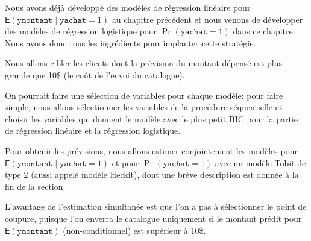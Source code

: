 \documentclass[
  11pt,
  letterpaper,
]{scrbook}
\theoremstyle{definition}
\theoremstyle{remark}
\begin{document}
Nous avons déjà développé des modèles de régression linéaire pour
\(\mathsf{E}(\texttt{ymontant} \mid \texttt{yachat}=1)\) au chapitre
précédent et nous venons de développer des modèles de régression
logistique pour \(\Pr(\texttt{yachat}=1)\) dans ce chapitre. Nous avons
donc tous les ingrédients pour implanter cette stratégie.

Nous allons cibler les clients dont la prévision du montant dépensé est
plus grande que 10\$ (le coût de l'envoi du catalogue).

On pourrait faire une sélection de variables pour chaque modèle: pour
faire simple, nous allons sélectionner les variables de la procédure
séquentielle et choisir les variables qui donnent le modèle avec le plus
petit BIC pour la partie de régression linéaire et la régression
logistique.

Pour obtenir les prévisions, nous allons estimer conjointement les
modèles pour \(\mathsf{E}(\texttt{ymontant} \mid \texttt{yachat}=1)\) et
pour \(\Pr(\texttt{yachat}=1)\) avec un modèle Tobit de type 2 (aussi
appelé modèle Heckit), dont une brève description est donnée à la fin de
la section.

L'avantage de l'estimation simultanée est que l'on a pas à sélectionner
le point de coupure, puisque l'on enverra le catalogue uniquement si le
montant prédit pour \(\mathsf{E}(\texttt{ymontant})\) (non-conditionnel)
est supérieur à 10\$.
\end{document}
